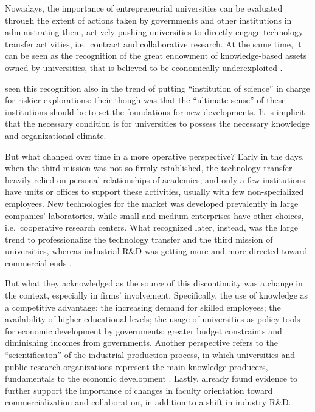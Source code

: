 Nowadays, the importance of entrepreneurial universities can be evaluated through the extent of actions taken by governments and other institutions in administrating them, actively pushing universities to directly engage technology transfer activities, i.e.\ contract and collaborative research. At the same time, it can be seen as the recognition of the great endowment of knowledge-based assets owned by universities, that is believed to be economically underexploited \citep{Tijssen2006}. 

\citet{Balconi2006} seen this recognition also in the trend of putting \enquote{institution of science} in charge for riskier explorations: their though was that the \enquote{ultimate sense} of these institutions should be to set the foundations for new developments. It is implicit that the necessary condition is for universities to possess the necessary knowledge and organizational climate.

But what changed over time in a more operative perspective? Early in the days, when the third mission was not so firmly established, the technology transfer heavily relied on personal relationships of academics, and only a few institutions have units or offices to support these activities, usually with few non-specialized employees. New technologies for the market was developed prevalently in large companies' laboratories, while small and medium enterprises have other choices, i.e.\ cooperative research centers. What \citet{Geuna2009} recognized later, instead, was the large trend to professionalize the technology transfer and the third mission of universities, whereas industrial R\&D was getting more and more directed toward commercial ends \citep{Fritsch2007}.

But what they acknowledged as the source of this discontinuity was a change in the context, especially in firms' involvement. Specifically, the use of knowledge as a competitive advantage; the increasing demand for skilled employees; the availability of higher educational levels; the usage of universities as policy tools for economic development by governments; greater budget constraints and diminishing incomes from governments. Another perspective refers to the \enquote{scientificaton} of the industrial production process, in which universities and public research organizations represent the main knowledge producers, fundamentals to the economic development \citep{Balderi2007}. Lastly, already \citet{Thursby2002} found evidence to further support the importance of changes in faculty orientation toward commercialization and collaboration, in addition to a shift in industry R\&D.

